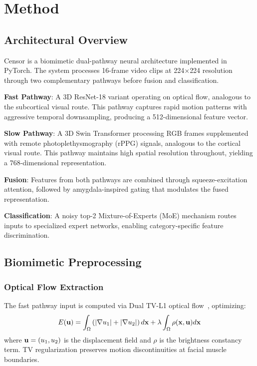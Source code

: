 
\section{Method}
\label{sec:method}

\subsection{Architectural Overview}

Censor is a biomimetic dual-pathway neural architecture implemented in PyTorch. The system processes 16-frame video clips at 224$\times$224 resolution through two complementary pathways before fusion and classification.

\textbf{Fast Pathway}: A 3D ResNet-18 variant operating on optical flow, analogous to the subcortical visual route. This pathway captures rapid motion patterns with aggressive temporal downsampling, producing a 512-dimensional feature vector.

\textbf{Slow Pathway}: A 3D Swin Transformer processing RGB frames supplemented with remote photoplethysmography (rPPG) signals, analogous to the cortical visual route. This pathway maintains high spatial resolution throughout, yielding a 768-dimensional representation.

\textbf{Fusion}: Features from both pathways are combined through squeeze-excitation attention, followed by amygdala-inspired gating that modulates the fused representation.

\textbf{Classification}: A noisy top-2 Mixture-of-Experts (MoE) mechanism routes inputs to specialized expert networks, enabling category-specific feature discrimination.

\subsection{Biomimetic Preprocessing}

\subsubsection{Optical Flow Extraction}

The fast pathway input is computed via Dual TV-L1 optical flow~\cite{wang2015offapexnet}, optimizing:
\begin{equation}
E(\mathbf{u}) = \int_\Omega \left( |\nabla u_1| + |\nabla u_2| \right) d\mathbf{x} + \lambda \int_\Omega \rho(\mathbf{x}, \mathbf{u}) d\mathbf{x}
\end{equation}
where $\mathbf{u} = (u_1, u_2)$ is the displacement field and $\rho$ is the brightness constancy term. TV regularization preserves motion discontinuities at facial muscle boundaries.

